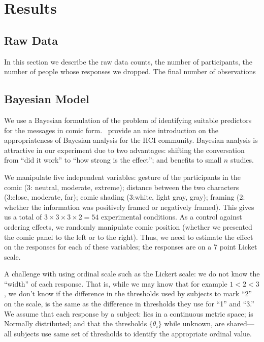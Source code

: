 
\section{Results}
\label{sec:Results}

\subsection{Raw Data}
\label{sub:Raw Data}
In this section we describe the raw data counts, the number of participants, the number of people whose responses we dropped. The final number of observations

\subsection{Bayesian Model}
\label{sub:Bayesian Model}
We use a Bayesian formulation of the problem of identifying suitable predictors for the messages in comic form.~\textcite{Kay2016} provide an nice introduction on the appropriateness of Bayesian analysis for the HCI community. Bayesian analysis is attractive in our experiment due to two advantages: shifting the conversation from ``did it work'' to ``how strong is the effect''; and benefits to small $n$ studies.

We manipulate five independent variables: gesture of the participants in the comic (3: neutral, moderate, extreme);  distance between the two characters (3:close, moderate, far); comic shading (3:white, light gray, gray); framing (2: whether the information was positively framed or negatively framed).  This gives us a total of $3 \times 3 \times 3 \times 2= 54$ experimental conditions. As a control against ordering effects, we randomly manipulate comic position (whether we presented the comic panel to the left or to the right).  Thus, we need to estimate the effect on the responses for each of these variables; the responses are on a 7 point Licket scale.

A challenge with using ordinal scale such as the Lickert scale: we do not know the ``width'' of each response. That is, while we may know that for example $1<2<3$, we don't know if the difference in the thresholds used by subjects to mark ``2'' on the scale, is the same as the difference in thresholds they use for ``1'' and ``3.''  We assume that each response by a subject: lies in a continuous metric space; is Normally distributed; and that the thresholds $\{\theta_i\}$ while unknown, are shared—all subjects use same set of thresholds to identify the appropriate ordinal value.

